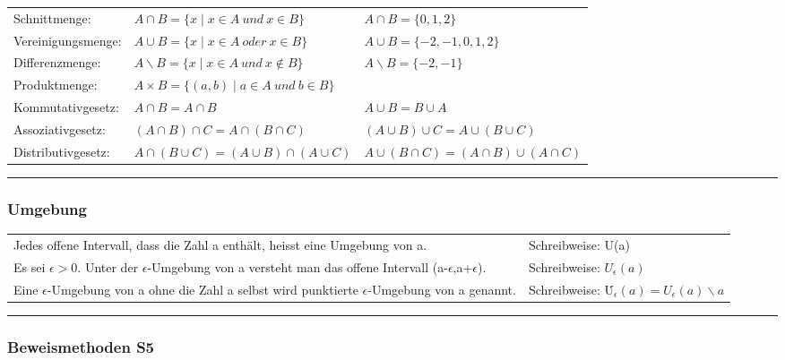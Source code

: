\documentclass[6pt,a4paper]{scrartcl}
\begin{document}
\begin{multicols*}{2}
\begin{tabulary}{12cm}{LLL}
Schnittmenge: 		& $A\cap B = \{x\mid x \in A\ und\ x\in B\}$ 				& 	$A\cap B = \{0,1,2\}$ 			\\
Vereinigungsmenge: 	& $A\cup B = \{x\mid x \in A\ oder\ x\in B\}$ 				& 	$A\cup B = \{-2,-1,0,1,2\}$		\\ 
Differenzmenge: 	& $A\smallsetminus B = \{x\mid x \in A\ und\ x\notin B\}$ 	& 	$A\smallsetminus B = \{-2,-1\}$	\\
Produktmenge: 		& $A\times B = \{(a,b)\mid a \in A\ und\ b\in B\}$ 			&									\\ 
Kommutativgesetz:	& $A\cap B = A\cap B$ 										&	$A\cup B = B\cup A$				\\
Assoziativgesetz: 	& $(A\cap B) \cap C = A \cap(B\cap C)$ 						&	$(A\cup B)\cup C = A\cup (B\cup C)$	\\
Distributivgesetz:	& $A \cap (B \cup C) = (A\cup B)\cap (A\cup C)$				&	$A \cup (B \cap C) = (A\cap B)\cup (A\cap C)$\\
\end{tabulary}
\hrule

\subsubsection{Umgebung} %
\color{black}
\label{sub:allgemeines}

\begin{tabulary}{12cm}{ll}
Jedes offene Intervall, dass die Zahl a enthält, heisst eine Umgebung von a. & Schreibweise: U(a) \\
Es sei $\epsilon  > 0$. Unter der $\epsilon $-Umgebung von a versteht man das offene Intervall (a-$\epsilon $,a+$ \epsilon $). & Schreibweise: $U_{\epsilon }(a)$ \\
Eine $\epsilon$-Umgebung von a ohne die Zahl a selbst wird punktierte $\epsilon$-Umgebung von a genannt.& Schreibweise: \.{U}$_{\epsilon}(a)= U_{\epsilon}(a) \smallsetminus a $ \\

\end{tabulary}
\hrule

\subsubsection{Beweismethoden \color{red} S5} %
\color{black}
\label{sub:allgemeines}

\end{multicols*}
\end{document}
